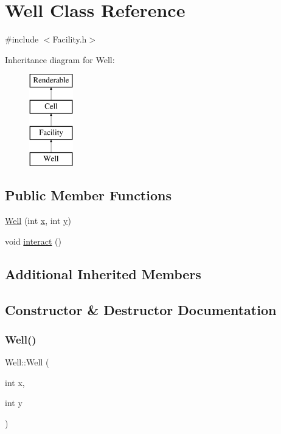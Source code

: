 \hypertarget{classWell}{}\section{Well Class Reference}
\label{classWell}


{\ttfamily \#include $<$Facility.\+h$>$}

Inheritance diagram for Well\+:\begin{figure}[H]
\begin{center}
\leavevmode
\includegraphics[height=4.000000cm]{classWell}
\end{center}
\end{figure}
\subsection*{Public Member Functions}
\begin{DoxyCompactItemize}
\item 
\mbox{\hyperlink{classWell_a576377230e9cc7301f3bae05eb65a4e1}{Well}} (int \mbox{\hyperlink{classFacility_a97a4d1f6f807e0e74c4283cf120daed9}{x}}, int \mbox{\hyperlink{classFacility_a28d1fbfe0699e800db094161504b0e44}{y}})
\item 
void \mbox{\hyperlink{classWell_a0b05bce6404fb86371f31ae7734ca01c}{interact}} ()
\end{DoxyCompactItemize}
\subsection*{Additional Inherited Members}


\subsection{Constructor \& Destructor Documentation}
\mbox{\label{classWell_a576377230e9cc7301f3bae05eb65a4e1}} 
\subsubsection{\texorpdfstring{Well()}{Well()}}
{\footnotesize\ttfamily Well\+::\+Well (\begin{DoxyParamCaption}\item[{int}]{x,  }\item[{int}]{y }\end{DoxyParamCaption})}



